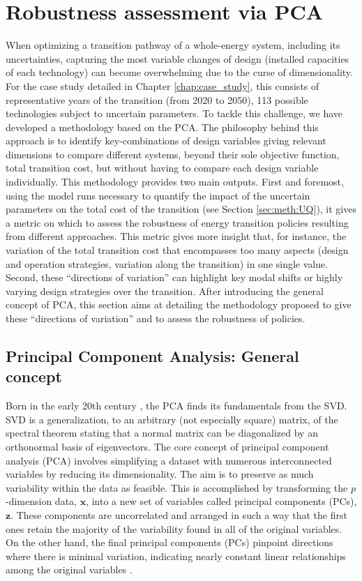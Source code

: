 \section{Robustness assessment via PCA}
\label{sec:meth:PCA}
When optimizing a transition pathway of a whole-energy system, including its uncertainties, capturing the most variable changes of design (\ie installed capacities of each technology) can become overwhelming due to the curse of dimensionality. For the case study detailed in Chapter \ref{chap:case_study}, this consists of  representative years of the transition (\ie from 2020 to 2050), 113 possible technologies subject to uncertain parameters. To tackle this challenge, we have developed a methodology based on the \acrfull{PCA}. The philosophy behind this approach is to identify key-combinations of design variables giving relevant dimensions to compare different systems, beyond their sole objective function, \ie total transition cost, but without having to compare each design variable individually. This methodology provides two main outputs. First and foremost, using the model runs necessary to quantify the impact of the uncertain parameters on the total cost of the transition (see Section \ref{sec:meth:UQ}), it gives a metric on which to assess the robustness of energy transition policies resulting from different approaches. This metric gives more insight that, for instance, the variation of the total transition cost that encompasses too many aspects (\ie design and operation strategies, variation along the transition) in one single value. Second, these ``directions of variation'' can highlight key modal shifts or highly varying design strategies over the transition. After introducing the general concept of \gls{PCA}, this section aims at detailing the methodology proposed to give these ``directions of variation'' and to assess the robustness of policies.

\subsection{Principal Component Analysis: General concept}
\label{subsec:meth:PCA:PCA}
Born in the early 20th century \cite{pearson1901on,hotelling1933analysis}, the \acrfull{PCA} finds its fundamentals from the \gls{SVD}. \gls{SVD} is a generalization, to an arbitrary (\ie not especially square) matrix, of the spectral theorem stating that a normal matrix can be diagonalized by an orthonormal basis of eigenvectors.  The core concept of principal component analysis (PCA) involves simplifying a dataset with numerous interconnected variables by reducing its dimensionality. The aim is to preserve as much variability within the data as feasible. This is accomplished by transforming the $p$-dimension data, $\mathbf{x}$, into a new set of variables called principal components (PCs), $\mathbf{z}$. These components are uncorrelated and arranged in such a way that the first ones retain the majority of the variability found in all of the original variables. On the other hand, the final principal components (PCs) pinpoint directions where there is minimal variation, indicating nearly constant linear relationships among the original variables \cite{jolliffe2002principal}. 

